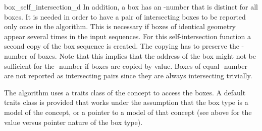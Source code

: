 \begin{ccRefFunction}{box_self_intersection_d}
In addition, a box has an -number that is distinct for
all boxes. It is needed in order to have a pair of intersecting boxes
to be reported only once in the algorithm. This is necessary if boxes
of identical geometry appear several times in the input sequences.
For this self-intersection function a second copy of the box sequence
is created. The copying has to preserve the -number of boxes.
Note that this implies that the address of the box might not be
sufficient for the -number if boxes are copied by value. Boxes of
equal -number are not reported as intersecting pairs since they are
always intersecting trivially.


The algorithm uses a traits class of the 
concept to access the boxes. A default traits class is provided that
works under the assumption that the box type is a model of the
 concept, or a pointer to a model of that
concept (see above for the value versus pointer nature of the box type).


 


\ccRequirements


\end{ccRefFunction}
